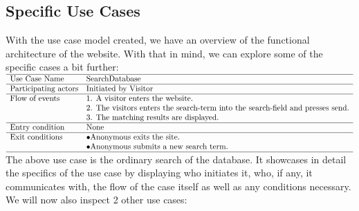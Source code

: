 \documentclass[12pt,a4paper]{article}
\begin{document}
\subsection{Specific Use Cases}

With the use case model created, we have an overview of the functional architecture of the website. With that in mind, we can explore some of the specific cases a bit further:\\

$\begin{array}{ll}
\hline
\text{Use Case Name}	& \text{SearchDatabase}\\
\hline
\text{Participating
	actors}	& \text{Initiated by Visitor}\\
\hline
\text{Flow of events}	& \text{1. A visitor enters the website.}\\
& \text{2. The visitors enters the search-term into the search-field and presses send.} \\
& \text{3. The matching results are displayed.}\\
\hline
\text{Entry condition}	& \text{None}\\
\hline
\text{Exit conditions}	& \bullet \text{Anonymous exits the site.}\\
& \bullet \text{Anonymous submits a new search term.}\\
\hline
\end{array}$
\\

The above use case is the ordinary search of the database. It showcases in detail the specifics of the use case by displaying who initiates it, who, if any, it communicates with, the flow of the case itself as well as any conditions necessary.
We will now also inspect 2 other use cases:\\
\end{document}
